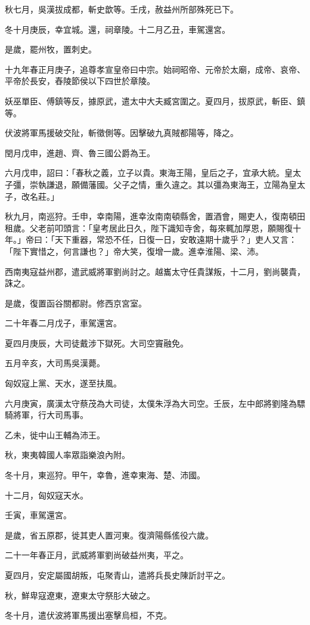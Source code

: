\begin{pinyinscope}
秋七月，吳漢拔成都，斬史歆等。壬戌，赦益州所部殊死已下。

冬十月庚辰，幸宜城。還，祠章陵。十二月乙丑，車駕還宮。

是歲，罷州牧，置刺史。

十九年春正月庚子，追尊孝宣皇帝曰中宗。始祠昭帝、元帝於太廟，成帝、哀帝、平帝於長安，舂陵節侯以下四世於章陵。

妖巫單臣、傅鎮等反，據原武，遣太中大夫臧宮圍之。夏四月，拔原武，斬臣、鎮等。

伏波將軍馬援破交阯，斬徵側等。因擊破九真賊都陽等，降之。

閏月戊申，進趙、齊、魯三國公爵為王。

六月戊申，詔曰：「春秋之義，立子以貴。東海王陽，皇后之子，宜承大統。皇太子彊，崇執謙退，願備藩國。父子之情，重久違之。其以彊為東海王，立陽為皇太子，改名莊。」

秋九月，南巡狩。壬申，幸南陽，進幸汝南南頓縣舍，置酒會，賜吏人，復南頓田租歲。父老前叩頭言：「皇考居此日久，陛下識知寺舍，每來輒加厚恩，願賜復十年。」帝曰：「天下重器，常恐不任，日復一日，安敢遠期十歲乎？」吏人又言：「陛下實惜之，何言謙也？」帝大笑，復增一歲。進幸淮陽、梁、沛。

西南夷寇益州郡，遣武威將軍劉尚討之。越巂太守任貴謀叛，十二月，劉尚襲貴，誅之。

是歲，復置函谷關都尉。修西京宮室。

二十年春二月戊子，車駕還宮。

夏四月庚辰，大司徒戴涉下獄死。大司空竇融免。

五月辛亥，大司馬吳漢薨。

匈奴寇上黨、天水，遂至扶風。

六月庚寅，廣漢太守蔡茂為大司徒，太僕朱浮為大司空。壬辰，左中郎將劉隆為驃騎將軍，行大司馬事。

乙未，徙中山王輔為沛王。

秋，東夷韓國人率眾詣樂浪內附。

冬十月，東巡狩。甲午，幸魯，進幸東海、楚、沛國。

十二月，匈奴寇天水。

壬寅，車駕還宮。

是歲，省五原郡，徙其吏人置河東。復濟陽縣傜役六歲。

二十一年春正月，武威將軍劉尚破益州夷，平之。

夏四月，安定屬國胡叛，屯聚青山，遣將兵長史陳訢討平之。

秋，鮮卑寇遼東，遼東太守祭肜大破之。

冬十月，遣伏波將軍馬援出塞擊烏桓，不克。


\end{pinyinscope}
